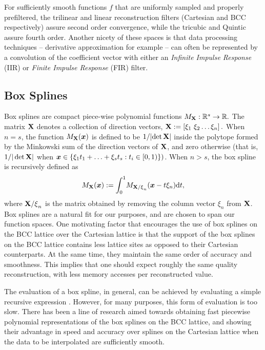 For sufficiently smooth functions $f$ that are uniformly sampled and properly prefiltered, the trilinear and linear reconstruction filters (Cartesian and BCC respectively) assure second order convergence, while the tricubic and Quintic assure fourth order. 
Another nicety of these spaces is that data processing techniques -- derivative approximation for example -- can often be represented by a convolution of the coefficient vector with either an \emph{Infinite Impulse Response} (IIR) or \emph{Finite Impulse Response} (FIR) filter. 

\subsection{Box Splines} \label{sec:box_review}
Box splines are compact piece-wise polynomial functions $ M_\mathbf{\mathbf{X}} : \mathbb{R}^s \to \mathbb{R}.$ 
The matrix $\mathbf{\mathbf{X}}$ denotes a collection of direction vectors, $\mathbf{\mathbf{X}} := \left[ \xi_1 \ \xi_2 \hdots \xi_n\right].$ 
When $n=s$, the function $M_\mathbf{\mathbf{X}}(\boldsymbol{x})$ is defined to be ${1}/|{\det\mathbf{\mathbf{X}}}|$ inside the polytope formed by the Minkowski sum of the direction vectors of $\mathbf{\mathbf{X}}$, and zero otherwise (that is, ${1}/{|\det\mathbf{\mathbf{X}}|}$ when $\boldsymbol{x} \in \{ \mathbf{\xi}_1 t_1 + \hdots + \mathbf{\xi}_s t_s  : t_i\in [0,1) \})$. 
When $n > s$, the box spline is recursively defined as {\small 
\begin{equation} \label{eq:box_def}
	M_{\mathbf{\Xii}}(\vx) := \int_0^1{\!M_{\mathbf{\Xii/\xi}_n}(\vx - t\mathbf{\xi}_n)} \mathrm{d}t,
\end{equation}}
where ${\mathbf{\mathbf{X}/\xi}_n}$ is the matrix obtained by removing the column vector $\xi_n$ from $\mathbf{\mathbf{X}}$. 
Box splines are a natural fit for our purposes, and are chosen to span our function spaces.
One motivating factor that encourages the use of box splines on the BCC lattice over the Cartesian lattice is that the support of the box splines on the BCC lattice contains less lattice sites as opposed to their Cartesian counterparts. 
At the same time, they maintain the same order of accuracy and smoothness. 
This implies that one should expect roughly the same quality reconstruction, with less memory accesses per reconstructed value.

The evaluation of a box spline, in general, can be achieved by evaluating a simple recursive expression \cite{boorboxsplines}. 
However, for many purposes, this form of evaluation is too slow. 
There has been a line of research \cite{firstbox} aimed towards obtaining fast piecewise polynomial representations of the box splines on the BCC lattice, and showing their advantage in speed and accuracy over splines on the Cartesian lattice when the data to be interpolated are sufficiently smooth.

